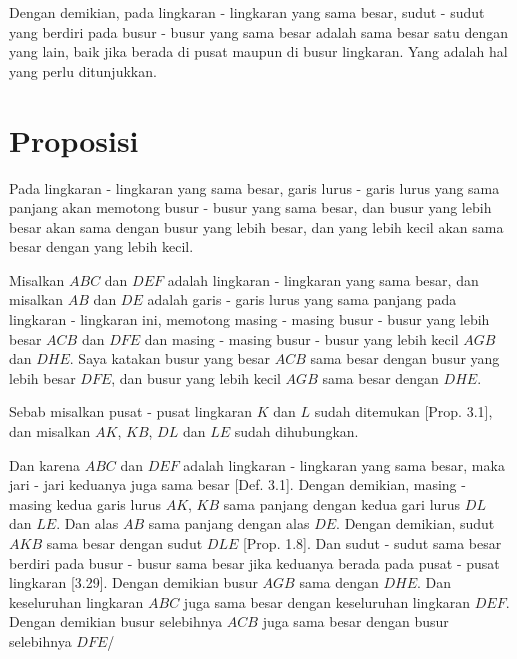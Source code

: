 \documentclass[a4paper]{book}
\begin{document}
Dengan demikian, pada lingkaran - lingkaran yang sama besar, sudut - sudut yang
berdiri pada busur - busur yang sama besar adalah sama besar satu dengan yang
lain, baik jika berada di pusat maupun di busur lingkaran. Yang adalah hal yang
perlu ditunjukkan.

\section*{\centering Proposisi \thesection}
Pada lingkaran - lingkaran yang sama besar, garis lurus - garis lurus yang sama
panjang akan memotong busur - busur yang sama besar, dan busur yang lebih
besar akan sama dengan busur yang lebih besar, dan yang lebih kecil akan sama
besar dengan yang lebih kecil.  

\begin{center}
\end{center}

Misalkan $ABC$ dan $DEF$ adalah lingkaran - lingkaran yang sama besar, dan 
misalkan $AB$ dan $DE$ adalah garis - garis lurus yang sama panjang pada
lingkaran - lingkaran ini, memotong masing - masing busur - busur yang lebih 
besar $ACB$ dan $DFE$ dan masing - masing busur - busur yang lebih kecil 
$AGB$ dan $DHE$. Saya katakan busur yang besar $ACB$ sama besar dengan busur
yang lebih besar $DFE$, dan busur yang lebih kecil $AGB$ sama besar dengan
$DHE$.

Sebab misalkan pusat - pusat lingkaran $K$ dan $L$ sudah ditemukan [Prop. 3.1],
dan misalkan $AK$, $KB$, $DL$ dan $LE$ sudah dihubungkan.

Dan karena $ABC$ dan $DEF$ adalah lingkaran - lingkaran yang sama besar, maka
jari - jari keduanya juga sama besar [Def. 3.1]. Dengan demikian, masing -
masing kedua garis lurus $AK$, $KB$ sama panjang dengan kedua gari lurus $DL$
dan $LE$. Dan alas $AB$ sama panjang dengan alas $DE$. Dengan demikian, sudut
$AKB$ sama besar dengan sudut $DLE$ [Prop. 1.8]. Dan sudut - sudut sama besar
berdiri pada busur - busur sama besar jika keduanya berada pada pusat - pusat
lingkaran [3.29]. Dengan demikian busur $AGB$ sama dengan $DHE$. Dan keseluruhan
lingkaran $ABC$ juga sama besar dengan keseluruhan lingkaran $DEF$. Dengan
demikian busur selebihnya $ACB$ juga sama besar dengan busur selebihnya $DFE$/
\end{document}
